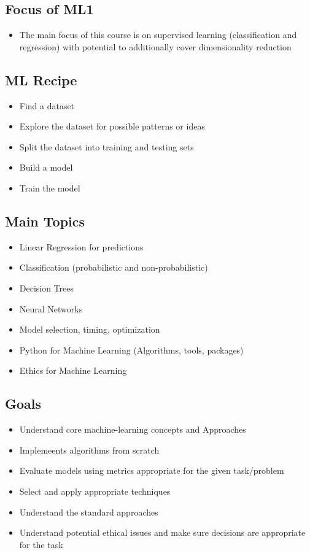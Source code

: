 \documentclass[12pt]{article}
\begin{document}
        \subsection{Focus of ML1}
            \begin{itemize}
                \item The main focus of this course is on supervised learning (classification and regression) with potential to additionally cover dimensionality reduction
            \end{itemize}
        \subsection{ML Recipe}
            \begin{itemize}
                \item Find a dataset
                \item Explore the dataset for possible patterns or ideas
                \item Split the dataset into training and testing sets
                \item Build a model
                \item Train the model
            \end{itemize}
        \subsection{Main Topics}
            \begin{itemize}
                \item Linear Regression for predictions
                \item Classification (probabilistic and non-probabilistic)
                \item Decision Trees
                \item Neural Networks
                \item Model selection, timing, optimization
                \item Python for Machine Learning (Algorithms, tools, packages)
                \item Ethics for Machine Learning
            \end{itemize}
        \subsection{Goals}
            \begin{itemize}
                \item Understand core machine-learning concepts and Approaches
                \item Implemeents algorithms from scratch
                \item Evaluate models using metrics appropriate for the given task/problem
                \item Select and apply appropriate techniques
                \item Understand the standard approaches
                \item Understand potential ethical issues and make sure decisions are appropriate for the task
            \end{itemize}
\end{document}
